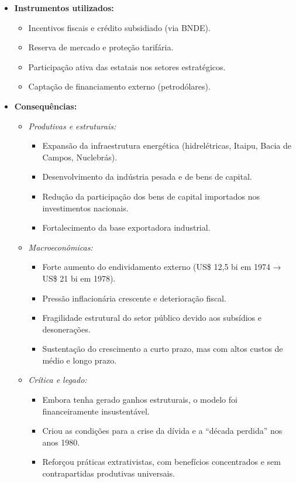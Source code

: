 \documentclass{sciposter}
\begin{document}
\begin{multicols}{3}
\begin{itemize}
    \item \textbf{Instrumentos utilizados:}
    \begin{itemize}
        \item Incentivos fiscais e crédito subsidiado (via BNDE).
        \item Reserva de mercado e proteção tarifária.
        \item Participação ativa das estatais nos setores estratégicos.
        \item Captação de financiamento externo (petrodólares).
    \end{itemize}

    \item \textbf{Consequências:}
    \begin{itemize}
        \item \textit{Produtivas e estruturais:}
        \begin{itemize}
            \item Expansão da infraestrutura energética (hidrelétricas, Itaipu, Bacia de Campos, Nuclebrás).
            \item Desenvolvimento da indústria pesada e de bens de capital.
            \item Redução da participação dos bens de capital importados nos investimentos nacionais.
            \item Fortalecimento da base exportadora industrial.
        \end{itemize}
        
        \item \textit{Macroeconômicas:}
        \begin{itemize}
            \item Forte aumento do endividamento externo (US\$ 12,5 bi em 1974 → US\$ 21 bi em 1978).
            \item Pressão inflacionária crescente e deterioração fiscal.
            \item Fragilidade estrutural do setor público devido aos subsídios e desonerações.
            \item Sustentação do crescimento a curto prazo, mas com altos custos de médio e longo prazo.
        \end{itemize}

        \item \textit{Crítica e legado:}
        \begin{itemize}
            \item Embora tenha gerado ganhos estruturais, o modelo foi financeiramente insustentável.
            \item Criou as condições para a crise da dívida e a “década perdida” nos anos 1980.
            \item Reforçou práticas extrativistas, com benefícios concentrados e sem contrapartidas produtivas universais.
        \end{itemize}
    \end{itemize}
\end{itemize}


\end{multicols}
\end{document}
